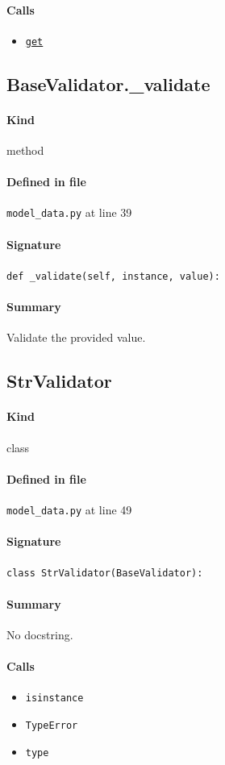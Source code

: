 \documentclass[11pt]{report}
\begin{document}
\paragraph{Calls}
\begin{itemize}[leftmargin=*]
  \item \hyperref[def:tests-test_backcaster.py:DAPrices.get:L294]{\texttt{get}}
\end{itemize}
\subsection{BaseValidator.\_validate}
\label{def:model_data.py:BaseValidator._validate:L39}
\paragraph{Kind} method
\paragraph{Defined in file} \texttt{model\_data.py} at line 39
\paragraph{Signature} \texttt{def \_validate(self, instance, value):}
\paragraph{Summary} Validate the provided value.
\subsection{StrValidator}
\label{def:model_data.py:StrValidator:L49}
\paragraph{Kind} class
\paragraph{Defined in file} \texttt{model\_data.py} at line 49
\paragraph{Signature} \texttt{class StrValidator(BaseValidator):}
\paragraph{Summary} No docstring.
\paragraph{Calls}
\begin{itemize}[leftmargin=*]
  \item \texttt{isinstance}
  \item \texttt{TypeError}
  \item \texttt{type}
\end{itemize}
\end{document}
